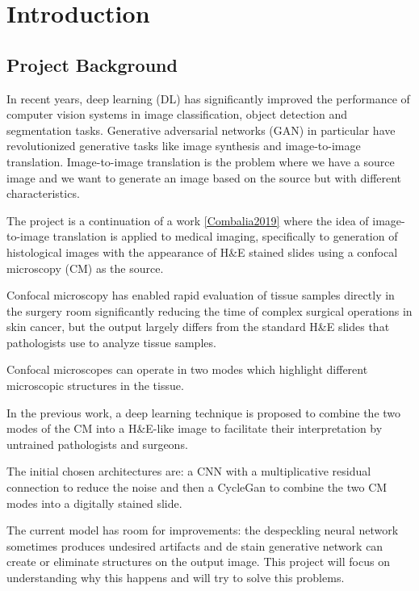 \hypertarget{introduction}{%
\section{Introduction}\label{introduction}}

\hypertarget{project-background}{%
\subsection{Project Background}\label{project-background}}

In recent years, deep learning (DL) has significantly improved the
performance of computer vision systems in image classification, object
detection and segmentation tasks. Generative adversarial networks (GAN)
in particular have revolutionized generative tasks like image synthesis
and image-to-image translation. Image-to-image translation is the
problem where we have a source image and we want to generate an image
based on the source but with different characteristics.

The project is a continuation of a work \ref{Combalia2019} where the idea of
image-to-image translation is applied to medical imaging, specifically
to generation of histological images with the appearance of H\&E stained
slides using a confocal microscopy (CM) as the source.

Confocal microscopy has enabled rapid evaluation of tissue samples
directly in the surgery room significantly reducing the time of complex
surgical operations in skin cancer, but the output largely differs from
the standard H\&E slides that pathologists use to analyze tissue
samples.

Confocal microscopes can operate in two modes which highlight different
microscopic structures in the tissue.

In the previous work, a deep learning technique is proposed to combine
the two modes of the CM into a H\&E-like image to facilitate their
interpretation by untrained pathologists and surgeons.

The initial chosen architectures are: a CNN with a multiplicative
residual connection to reduce the noise and then a CycleGan to combine
the two CM modes into a digitally stained slide.

The current model has room for improvements: the despeckling neural
network sometimes produces undesired artifacts and de stain generative
network can create or eliminate structures on the output image. This
project will focus on understanding why this happens and will try to
solve this problems.

